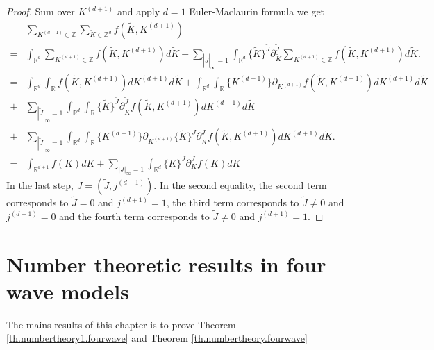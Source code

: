 \begin{proof}
Sum over $K^{(d+1)}$ and apply $d=1$ Euler-Maclaurin formula we get
\begin{equation}
\begin{split}
    &\sum_{K^{(d+1)}\in\mathbb{Z}}\sum_{\widetilde{K}\in\mathbb{Z}^d} f(\widetilde{K},K^{(d+1)})
    \\
    =&\int_{\mathbb{R}^d} \sum_{K^{(d+1)}\in\mathbb{Z}}f(\widetilde{K},K^{(d+1)})d\widetilde{K}+\sum_{ |\widetilde{J}|_{\infty} = 1}\int_{\mathbb{R}^d} \{\widetilde{K}\}^{\widetilde{J}} \partial_{\widetilde{K}}^{\widetilde{J}}\sum_{K^{(d+1)}\in\mathbb{Z}}f(\widetilde{K},K^{(d+1)}) d\widetilde{K}.
    \\
    =&\int_{\mathbb{R}^d} \int_{\mathbb{R}}f(\widetilde{K},K^{(d+1)})dK^{(d+1)} d\widetilde{K}+\int_{\mathbb{R}^d} \int_{\mathbb{R}}\{K^{(d+1)}\}\partial_{K^{(d+1)}}f(\widetilde{K},K^{(d+1)})dK^{(d+1)} d\widetilde{K}
    \\
    +&\sum_{ |\widetilde{J}|_{\infty} = 1}\int_{\mathbb{R}^d}\int_{\mathbb{R}} \{\widetilde{K}\}^{\widetilde{J}} \partial_{\widetilde{K}}^{\widetilde{J}}f(\widetilde{K},K^{(d+1)})dK^{(d+1)} d\widetilde{K}
    \\
    +&\sum_{ |\widetilde{J}|_{\infty} = 1}\int_{\mathbb{R}^d}\int_{\mathbb{R}}\{K^{(d+1)}\}\partial_{K^{(d+1)}} \{\widetilde{K}\}^{\widetilde{J}} \partial_{\widetilde{K}}^{\widetilde{J}}f(\widetilde{K},K^{(d+1)})dK^{(d+1)} d\widetilde{K}.
    \\
    =&\int_{\mathbb{R}^{d+1}} f(K)dK + \sum_{ |J|_{\infty} = 1}\int_{\mathbb{R}^d} \{K\}^{J} \partial_K^{J}f(K) dK
\end{split}
\end{equation}
In the last step, $J=(\widetilde{J},j^{(d+1)})$. In the second equality, the second term corresponds to $\widetilde{J}=0$ and $j^{(d+1)}=1$, the third term corresponds to $\widetilde{J}\ne 0$ and $j^{(d+1)}=0$ and the fourth term corresponds to $\widetilde{J}\ne 0$ and $j^{(d+1)}=1$.
\end{proof}


\section{Number theoretic results in four wave models}

The mains results of this chapter is to prove Theorem \ref{th.numbertheory1.fourwave} and Theorem \ref{th.numbertheory.fourwave} 

